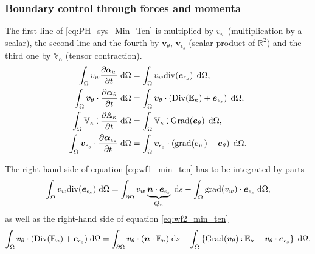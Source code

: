 \documentclass[preprint,12pt]{elsarticle}
\def\onedot{$\mathsurround0pt\ldotp$}
\def\cddot{%
	\mathbin{\vcenter{\baselineskip.67ex
			\hbox{\onedot}\hbox{\onedot}}%
}}
\begin{document}
\subsubsection{Boundary control through forces and momenta}
The first line of \eqref{eq:PH_sys_Min_Ten} is multiplied  by $v_w$ (multiplication by a scalar), the second line and the fourth by $\bm{v}_{\theta}$, $\bm{v}_{\epsilon_s}$ (scalar product of $\mathbb{R}^2$) and the third one by $\mathbb{V}_{\kappa}$ (tensor contraction).
\begin{align}
\int_{\Omega} v_w \diffp{\alpha_w}{t}  \d\Omega &=  \int_{\Omega} v_w \mathrm{div}(\bm{e}_{\epsilon_s}) \, \d\Omega,  \label{eq:wf1_min_ten}\\
\int_{\Omega} \bm{v}_{\theta} \cdot \diffp{\bm\alpha_{\theta}}{t}   \d\Omega &= \int_{\Omega} \bm{v}_{\theta} \cdot (\mathrm{Div}( \mathbb{E}_{\kappa}) + \bm{e}_{\epsilon_s}) \,  \d\Omega,  \label{eq:wf2_min_ten} \\
\int_{\Omega} \mathbb{V}_{\kappa} \cddot \diffp{\mathbb{A}_{\kappa}}{t}   \d\Omega &= \int_{\Omega} \mathbb{V}_{\kappa} \cddot \mathrm{Grad}(\bm{e}_\theta) \, \d\Omega, \label{eq:wf3_min_ten} \\
\int_{\Omega} \bm{v}_{\epsilon_s} \cdot \diffp{\bm\alpha_{\epsilon_s}}{t}   \d\Omega &= \int_{\Omega} \bm{v}_{\epsilon_s} \cdot (\mathrm{grad}({e}_{w}) - \bm{e}_{\theta}) \, \d\Omega.  \label{eq:wf4_min_ten}
\end{align}

The right-hand side of equation \eqref{eq:wf1_min_ten} has to be integrated by parts
\begin{equation}
\label{eq:line1_ten_min}
\int_{\Omega} v_w \mathrm{div}(\bm{e}_{\epsilon_s})  \d\Omega = \int_{\partial \Omega} v_w \underbrace{\bm{n} \cdot \bm{e}_{\epsilon_s}}_{Q_n}  \d{s} - \int_{\Omega} \mathrm{grad}(v_w)  \cdot \bm{e}_{\epsilon_s}  \d\Omega,\end{equation}
as well as the right-hand side of equation \eqref{eq:wf2_min_ten}
\begin{equation}
\label{eq:line2_ten_min}
\int_{\Omega} \bm{v}_{\theta} \cdot (\mathrm{Div}(\mathbb{E}_{\kappa}) + \bm{e}_{\epsilon_s})  \d\Omega = \int_{\partial \Omega} \bm{v}_{\theta} \cdot (\bm{n} \cdot \mathbb{E}_{\kappa})  \d{s} -\int_{\Omega} \left\{ \mathrm{Grad}(\bm{v}_{\theta}) \cddot \mathbb{E}_{\kappa} - \bm{v}_{\theta} \cdot \bm{e}_{\epsilon_s}\right\}  \d\Omega.
\end{equation}
\end{document}
